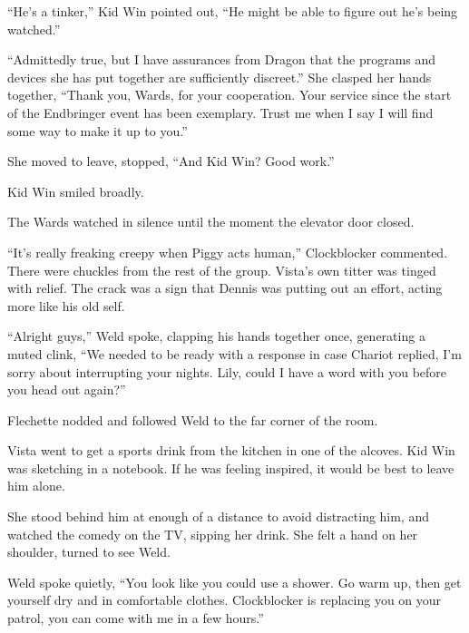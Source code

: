 ``He's a tinker,'' Kid Win pointed out, ``He might be able to figure out he's being watched.''



``Admittedly true, but I have assurances from Dragon that the programs and devices she has put together are sufficiently discreet.''  She clasped her hands together, ``Thank you, Wards, for your cooperation.  Your service since the start of the Endbringer event has been exemplary.  Trust me when I say I will find some way to make it up to you.''



She moved to leave, stopped, ``And Kid Win?  Good work.''



Kid Win smiled broadly.



The Wards watched in silence until the moment the elevator door closed.



``It's really freaking creepy when Piggy acts human,'' Clockblocker commented.  There were chuckles from the rest of the group.  Vista's own titter was tinged with relief.  The crack was a sign that Dennis was putting out an effort, acting more like his old self.



``Alright guys,'' Weld spoke, clapping his hands together once, generating a muted clink, ``We needed to be ready with a response in case Chariot replied, I'm sorry about interrupting your nights.  Lily, could I have a word with you before you head out again?''



Flechette nodded and followed Weld to the far corner of the room.



Vista went to get a sports drink from the kitchen in one of the alcoves.  Kid Win was sketching in a notebook.  If he was feeling inspired, it would be best to leave him alone.



She stood behind him at enough of a distance to avoid distracting him, and watched the comedy on the TV, sipping her drink.  She felt a hand on her shoulder, turned to see Weld.



Weld spoke quietly, ``You look like you could use a shower.  Go warm up, then get yourself dry and in comfortable clothes.  Clockblocker is replacing you on your patrol, you can come with me in a few hours.''



